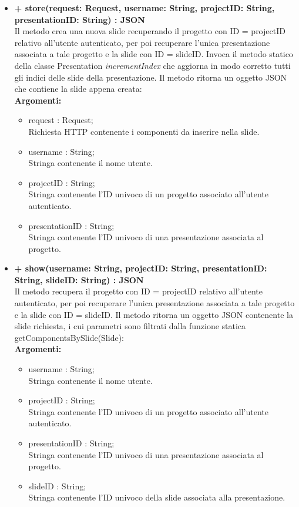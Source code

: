 \begin{itemize}
			\item \textbf{+ store(request: Request, username: String, projectID: String, presentationID: String) : \gls{JSON}}\\
				Il metodo crea una nuova \gls{slide} recuperando il progetto con ID = projectID relativo all'utente autenticato, per poi recuperare l'unica presentazione associata a tale progetto e la \gls{slide} con ID = slideID. Invoca il metodo statico della classe Presentation \textit{incrementIndex} che aggiorna in modo corretto tutti gli indici delle \gls{slide} della presentazione. Il metodo ritorna un oggetto \gls{JSON} che contiene la \gls{slide} appena creata:\\
				\textbf{Argomenti:}
				\begin{itemize}
					\item request : Request;\\
					Richiesta HTTP contenente i componenti da inserire nella \gls{slide}.
					\item username : String; \\
					Stringa contenente il nome utente.
					\item projectID : String; \\
					Stringa contenente l'ID univoco di un progetto associato all'utente autenticato.
					\item presentationID : String; \\
					Stringa contenente l'ID univoco di una presentazione associata al progetto.
				\end{itemize}
			
			\newpage
			\item \textbf{+ show(username: String, projectID: String, presentationID: String, slideID: String) : \gls{JSON}}\\
				Il metodo recupera il progetto con ID = projectID relativo all'utente autenticato, per poi recuperare l'unica presentazione associata a tale progetto e la \gls{slide} con ID = slideID. Il metodo ritorna un oggetto \gls{JSON} contenente la \gls{slide} richiesta, i cui parametri sono filtrati dalla funzione statica getComponentsBySlide(Slide):\\
				\textbf{Argomenti:}
					\begin{itemize}
						\item username : String; \\
						Stringa contenente il nome utente.
						\item projectID : String; \\
						Stringa contenente l'ID univoco di un progetto associato all'utente autenticato.
						\item presentationID : String; \\
						Stringa contenente l'ID univoco di una presentazione associata al progetto.
						\item slideID : String; \\
						Stringa contenente l'ID univoco della \gls{slide} associata alla presentazione.
					\end{itemize}
					

\end{itemize}
